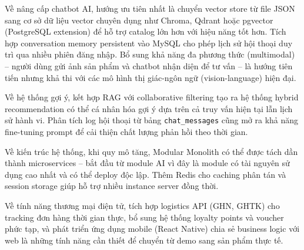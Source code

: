 Về nâng cấp chatbot AI, hướng ưu tiên nhất là chuyển vector store từ file JSON sang cơ sở dữ liệu vector chuyên dụng như Chroma, Qdrant hoặc pgvector (PostgreSQL extension) để hỗ trợ catalog lớn hơn với hiệu năng tốt hơn. Tích hợp conversation memory persistent vào MySQL cho phép lịch sử hội thoại duy trì qua nhiều phiên đăng nhập. Bổ sung khả năng đa phương thức (multimodal) -- người dùng gửi ảnh sản phẩm và chatbot nhận diện để tư vấn -- là hướng tiên tiến nhưng khả thi với các mô hình thị giác-ngôn ngữ (vision-language) hiện đại.

Về hệ thống gợi ý, kết hợp RAG với collaborative filtering tạo ra hệ thống hybrid recommendation có thể cá nhân hóa gợi ý dựa trên cả truy vấn hiện tại lẫn lịch sử hành vi. Phân tích log hội thoại từ bảng \texttt{chat\_messages} cũng mở ra khả năng fine-tuning prompt để cải thiện chất lượng phản hồi theo thời gian.

Về kiến trúc hệ thống, khi quy mô tăng, Modular Monolith có thể được tách dần thành microservices -- bắt đầu từ module AI vì đây là module có tài nguyên sử dụng cao nhất và có thể deploy độc lập. Thêm Redis cho caching phân tán và session storage giúp hỗ trợ nhiều instance server đồng thời.

Về tính năng thương mại điện tử, tích hợp logistics API (GHN, GHTK) cho tracking đơn hàng thời gian thực, bổ sung hệ thống loyalty points và voucher phức tạp, và phát triển ứng dụng mobile (React Native) chia sẻ business logic với web là những tính năng cần thiết để chuyển từ demo sang sản phẩm thực tế.
